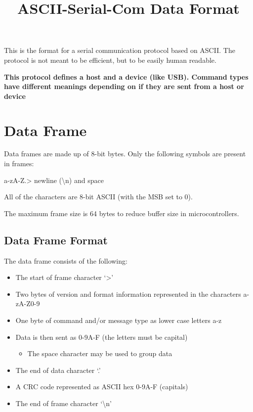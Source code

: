 \documentclass{customdocclass}
\title{ASCII-Serial-Com Data Format}
\begin{document}
\maketitle

This is the format for a serial communication protocol based on ASCII. The
protocol is not meant to be efficient, but to be easily human readable.

\textbf{This protocol defines a host and a device (like USB). Command types
have different meanings depending on if they are sent from a host or device}

\section{Data Frame}

Data frames are made up of 8-bit bytes. Only the following symbols are present in frames:

\vspace{1em}

a-zA-Z.> newline (\textbackslash n) and space

\vspace{1em}

All of the characters are 8-bit ASCII (with the MSB set to 0).

The maximum frame size is 64 bytes to reduce buffer size in microcontrollers.

\subsection{Data Frame Format}

The data frame consists of the following:

\begin{itemize}
  \item The start of frame character `>'
  \item Two bytes of version and format information represented in the characters a-zA-Z0-9
  \item One byte of command and/or message type as lower case letters a-z
  \item Data is then sent as 0-9A-F (the letters must be capital)
  \begin{itemize}
    \item The space character may be used to group data
  \end{itemize}
  \item The end of data character `.'
  \item A CRC code represented as ASCII hex 0-9A-F (capitals)
  \item The end of frame character `\textbackslash n'
\end{itemize}
\end{document}
